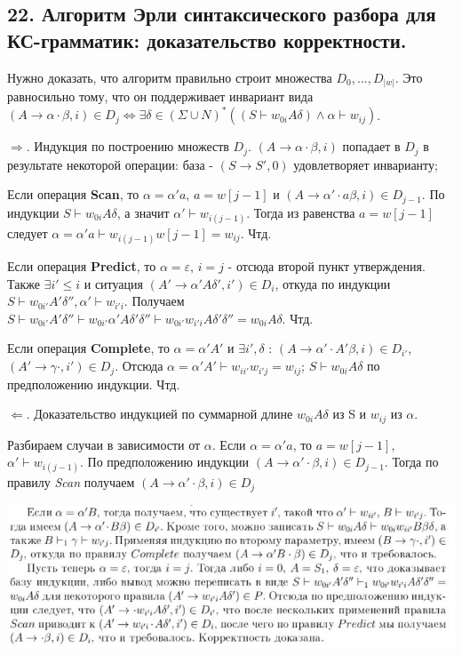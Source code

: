 \subsection{22. Алгоритм Эрли синтаксического разбора для КС-грамматик: доказательство корректности.}

Нужно доказать, что алгоритм правильно строит множества $D_0, \dots, D_{|w|}$. Это равносильно тому, что он  поддерживает инвариант вида $(A \rightarrow \alpha \cdot \beta, i) \in D_j \Leftrightarrow \exists \delta \in (\Sigma \cup N)^* ((S \vdash w_{0i} A\delta) \wedge \alpha \vdash w_{ij})$.

\Proof 
$\Rightarrow$. Индукция по построению множеств $D_j$. $(A \rightarrow \alpha \cdot \beta, i)$ попадает в $D_j$ в результате некоторой операции: база - $(S \rightarrow S', 0)$ удовлетворяет инварианту; 

Если операция \textbf{Scan}, то $\alpha = \alpha' a$, $a = w[j - 1]$ и $(A \rightarrow \alpha' \cdot a \beta, i) \in D_{j-1}$. По индукции $S \vdash w_{0i}A\delta$, а значит $\alpha' \vdash w_{i(j - 1)}$. Тогда из равенства $a = w[j - 1]$ следует $\alpha = \alpha' a \vdash  w_{i(j - 1)}w[j - 1] = w_{ij}$. Чтд.

Если операция \textbf{Predict}, то $\alpha = \varepsilon$, $i = j$ - отсюда второй пункт утверждения. Также $\exists i' \leqslant i$ и ситуация $(A' \rightarrow \alpha'A \delta', i') \in D_i$, откуда по индукции $S \vdash w_{0i'}A'\delta'', \alpha' \vdash w_{i'i}. $ Получаем $S \vdash  w_{0i'}A'\delta'' \vdash w_{0i'}\alpha' A \delta' \delta'' \vdash w_{0i'}w_{i'i}A\delta' \delta'' = w_{0i}A \delta$. Чтд.

Если операция \textbf{Complete}, то $\alpha = \alpha' A'$ и $\exists i', \delta$ : $(A \rightarrow \alpha' \cdot A' \beta, i) \in D_{i'}$, $(A' \rightarrow \gamma \cdot, i') \in D_j$. Отсюда $\alpha = \alpha' A' \vdash w_{ii'}w_{i'j} = w_{ij}$; $S \vdash w_{0i}A\delta$ по предположению индукции. Чтд.

$\Leftarrow$. Доказательство индукцией по суммарной длине $w_{0i}A\delta$ из S и $w_{ij}$ из $\alpha$. 

Разбираем случаи в зависимости от $\alpha$. Если $\alpha = \alpha' a$, то $a = w[j-1]$, $\alpha' \vdash w_{i(j-1)}$. По предположению индукции $(A \rightarrow \alpha ' \cdot \beta, i) \in D_{j - 1}$. Тогда по правилу \textit{Scan} получаем  $(A \rightarrow \alpha ' \cdot \beta, i) \in D_{j}$

\includegraphics[]{images/formal18_2.JPG}
\EndProof